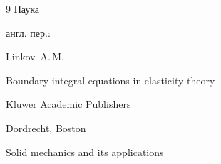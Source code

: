 \begin{thebibliography}{9}
\publ Наука



\transl англ. пер.:~

\by Linkov~A.\,M.

\book Boundary integral equations in elasticity theory

\publ Kluwer Academic Publishers

\publaddr Dordrecht, Boston 

\serial Solid mechanics and its applications 








\end{thebibliography}





\hskip6.5cm \thedate \par

\hskip6.5cm\therevdate\par




%




\makeengtitlem





\newpage

%

%

